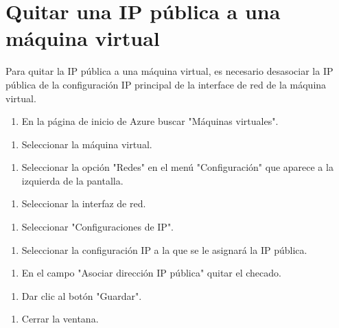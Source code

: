 \section{Quitar una IP pública a una máquina virtual}

Para quitar la IP pública a una máquina virtual, es necesario desasociar la IP pública de la configuración IP principal de la interface de red de la máquina virtual.

\begin{enumerate}
\item En la página de inicio de Azure buscar "Máquinas virtuales".
\end{enumerate}

\begin{enumerate}
\item Seleccionar la máquina virtual.
\end{enumerate}

\begin{enumerate}
\item Seleccionar la opción "Redes" en el menú "Configuración" que aparece a la izquierda de la pantalla.
\end{enumerate}

\begin{enumerate}
\item Seleccionar la interfaz de red.
\end{enumerate}

\begin{enumerate}
\item Seleccionar "Configuraciones de IP".
\end{enumerate}

\begin{enumerate}
\item Seleccionar la configuración IP a la que se le asignará la IP pública.
\end{enumerate}

\begin{enumerate}
\item En el campo "Asociar dirección IP pública" quitar el checado.
\end{enumerate}

\begin{enumerate}
\item Dar clic al botón "Guardar".
\end{enumerate}

\begin{enumerate}
\item Cerrar la ventana.
\end{enumerate}

